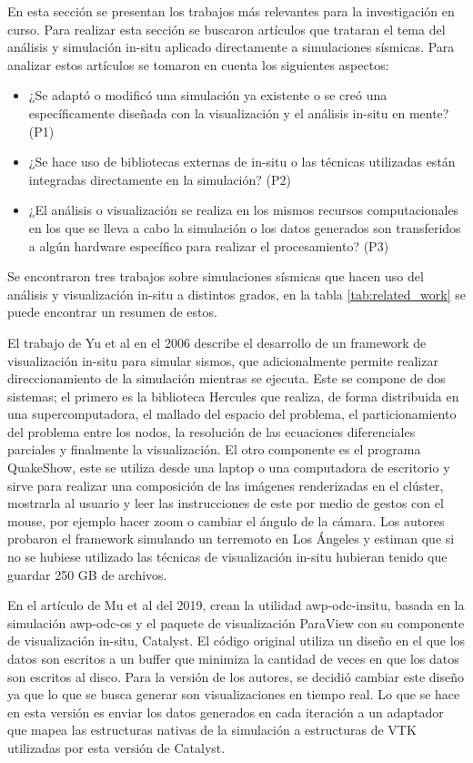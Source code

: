 En esta sección se presentan los trabajos más relevantes para la investigación en curso. Para realizar esta sección se buscaron artículos que trataran el tema del análisis y simulación in-situ aplicado directamente a simulaciones sísmicas. Para analizar estos artículos se tomaron en cuenta los siguientes aspectos:
\begin{itemize}
    \item ¿Se adaptó o modificó una simulación ya existente o se creó una específicamente diseñada con la visualización y el análisis in-situ en mente? (P1)
    \item ¿Se hace uso de bibliotecas externas de in-situ o las técnicas utilizadas están integradas directamente en la simulación? (P2)
    \item ¿El análisis o visualización se realiza en los mismos recursos computacionales en los que se lleva a cabo la simulación o los datos generados son transferidos a algún hardware específico para realizar el procesamiento? (P3)
\end{itemize}

Se encontraron tres trabajos sobre simulaciones sísmicas que hacen uso del análisis y visualización in-situ a distintos grados, en la tabla \ref{tab:related_work} se puede encontrar un resumen de estos.

El trabajo de Yu et al \cite{Yu2006} en el 2006 describe el desarrollo de un framework de visualización in-situ para simular sismos, que adicionalmente permite realizar direccionamiento de la simulación mientras se ejecuta. Este se compone de dos sistemas; el primero es la biblioteca Hercules que realiza, de forma distribuida en una supercomputadora, el mallado del espacio del problema, el particionamiento del problema entre los nodos, la resolución de las ecuaciones diferenciales parciales y finalmente la visualización. El otro componente es el programa QuakeShow, este se utiliza desde una laptop o una computadora de escritorio y sirve para realizar una composición de las imágenes renderizadas en el clúster, mostrarla al usuario y leer las instrucciones de este por medio de gestos con el mouse, por ejemplo hacer zoom o cambiar el ángulo de la cámara.
Los autores probaron el framework simulando un terremoto en Los Ángeles y estiman que si no se hubiese utilizado las técnicas de visualización in-situ hubieran tenido que guardar 250 GB de archivos.

En el artículo de Mu et al \cite{mu_-situ_2019} del 2019, crean la utilidad awp-odc-insitu, basada en la simulación awp-odc-os y el paquete de visualización ParaView con su componente de visualización in-situ, Catalyst. El código original utiliza un diseño en el que los datos son escritos a un buffer que minimiza la cantidad de veces en que los datos son escritos al disco. Para la versión de los autores, se decidió cambiar este diseño ya que lo que se busca generar son visualizaciones en tiempo real. Lo que se hace en esta versión es enviar los datos generados en cada iteración a un adaptador que mapea las estructuras nativas de la simulación a estructuras de VTK utilizadas por esta versión de Catalyst.

